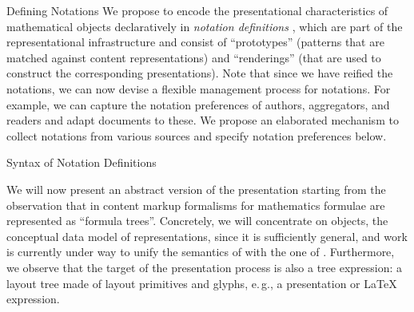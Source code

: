 \begin{omgroup}[creators=miko,short={Notation and Presentation},id=pres]
\begin{omgroup}[creators={miko,frabe},id=sec:ntn-definition]{Defining Notations}
  We propose to encode the presentational characteristics of mathematical objects
  declaratively in \emph{notation definitions} , which are part of the
  representational infrastructure and consist of ``prototypes''
   (patterns that are matched against content
  representations) and ``renderings'' (that are used to construct the corresponding
  presentations). Note that since we have reified the notations, we can now devise a
  flexible management process for notations. For example, we can capture the notation
  preferences of authors, aggregators, and readers and adapt documents to these. We
  propose an elaborated mechanism to collect notations from various sources and specify
  notation preferences below.

\begin{omgroup}[id=sec:nd:syntax]{Syntax of Notation Definitions}%
\newcommand{\bnfas}{::=} %
\newcommand{\bnfalt}{|} %
\newcommand{\bnfbracket}[1]{[#1]} %

  We will now present an abstract version of the presentation starting from the
  observation that in content markup formalisms for mathematics formulae are represented
  as ``formula trees''. Concretely, we will concentrate on {\openmath} objects, the
  conceptual data model of {\openmath} representations, since it is sufficiently general,
  and work is currently under way to unify the semantics of {\mathml} with the one of
  {\openmath}. Furthermore, we observe that the target of the presentation process is also
  a tree expression: a layout tree made of layout primitives and glyphs, e.\,g., a
  presentation {\mathml} or {\LaTeX} expression.


\end{omgroup}
\end{omgroup}
\end{omgroup}
